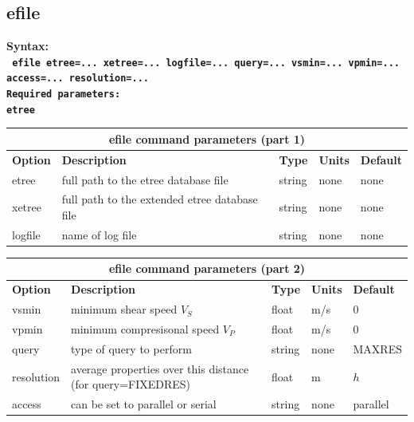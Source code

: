 \documentclass[11pt]{report}
\begin{document}
%

\subsection{efile}
\label{keyword:efile}
\begin{flushleft}
\bf
Syntax:\\
\tt
efile etree=... xetree=... logfile=... query=... vsmin=... vpmin=... access=... resolution=...\\
\bf 
Required parameters:\\
\tt etree
\end{flushleft}
\begin{center}
\begin{tabular}{|l|p{8cm}|l|l|l|} \hline
\multicolumn{5}{|c|}{\bf efile command parameters (part 1)}\\ \hline
\bf{Option} & \bf{Description}                                    & \bf{Type} & \bf{Units} & \bf{Default} \\ \hline 
\hline
etree      & full path to the etree database file                 & string   & none       & none \\ \hline
xetree     & full path to the extended etree database file        & string   & none       & none \\ \hline
logfile    & name of log file                                     & string   & none   & none \\ \hline
\end{tabular}
\end{center}
\begin{center}
\begin{tabular}{|l|p{8cm}|l|l|l|} \hline
\multicolumn{5}{|c|}{\bf efile command parameters (part 2)}\\ \hline
\bf{Option} & \bf{Description}                                & \bf{Type} & \bf{Units} & \bf{Default} \\ \hline 
\hline
vsmin   & minimum shear speed $V_S$         & float    & m/s    & 0 \\ \hline
vpmin   & minimum compresisonal speed $V_P$ & float    & m/s    & 0 \\ \hline 
\hline
query      & type of query to perform                         & string  & none   & MAXRES \\ \hline
resolution & average properties over this distance (for query=FIXEDRES) & float  & m      & $h$ \\ \hline
access     & can be set to parallel or serial                 & string  & none   &  parallel \\ \hline
\end{tabular}
\end{center}
\end{document}
